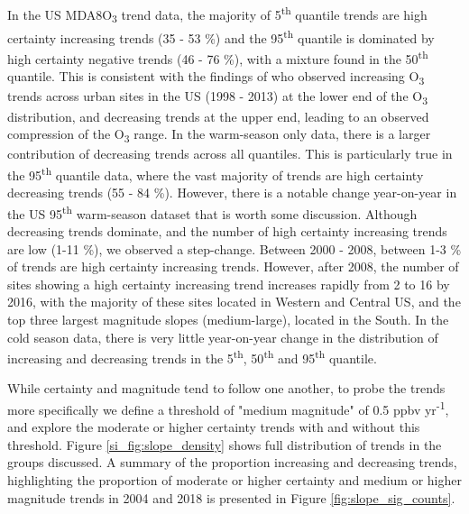 \documentclass[journal abbreviation, manuscript]{copernicus}
\begin{document}
In the US MDA8O\textsubscript{3} trend data, the majority of 5\textsuperscript{th} quantile trends are high certainty increasing trends (35 - 53 \%) and the 95\textsuperscript{th} quantile is dominated by high certainty negative trends (46 - 76 \%), with a mixture found in the 50\textsuperscript{th} quantile. This is consistent with the findings of \cite{Simon_2015} who observed increasing O\textsubscript{3} trends across urban sites in the US (1998 - 2013) at the lower end of the O\textsubscript{3} distribution, and decreasing trends at the upper end, leading to an observed compression of the O\textsubscript{3} range. In the warm-season only data, there is a larger contribution of decreasing trends across all quantiles. This is particularly true in the 95\textsuperscript{th} quantile data, where the vast majority of trends are high certainty decreasing trends (55 - 84 \%). However, there is a notable change year-on-year in the US 95\textsuperscript{th} warm-season dataset that is worth some discussion. Although decreasing trends dominate, and the number of high certainty increasing trends are low (1-11 \%), we observed a step-change. Between 2000 - 2008, between 1-3 \% of trends are high certainty increasing trends. However, after 2008, the number of sites showing a high certainty increasing trend increases rapidly from 2 to 16 by 2016, with the majority of these sites located in Western and Central US, and the top three largest magnitude slopes (medium-large), located in the South. In the cold season data, there is very little year-on-year change in the distribution of increasing and decreasing trends in the 5\textsuperscript{th}, 50\textsuperscript{th} and 95\textsuperscript{th} quantile.

While certainty and magnitude tend to follow one another, to probe the trends more specifically we define a threshold of "medium magnitude" of 0.5 ppbv yr\textsuperscript{-1}, and explore the moderate or higher certainty trends with and without this threshold. Figure \ref{si_fig:slope_density} shows full distribution of trends in the groups discussed. A summary of the proportion increasing and decreasing trends, highlighting the proportion of moderate or higher certainty and medium or higher magnitude trends in 2004 and 2018 is presented in Figure \ref{fig:slope_sig_counts}.
\end{document}
